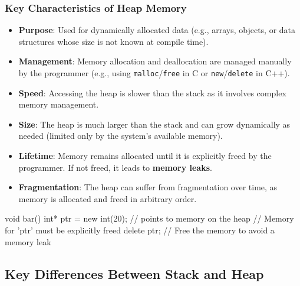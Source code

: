 \subsubsection{Key Characteristics of Heap Memory}
\begin{itemize}
    \item \textbf{Purpose}: Used for dynamically allocated data (e.g., arrays, objects, or data structures whose size is not known at compile time).
    \item \textbf{Management}: Memory allocation and deallocation are managed manually by the programmer (e.g., using \texttt{malloc}/\texttt{free} in C or \texttt{new}/\texttt{delete} in C++).
    \item \textbf{Speed}: Accessing the heap is slower than the stack as it involves complex memory management.
    \item \textbf{Size}: The heap is much larger than the stack and can grow dynamically as needed (limited only by the system's available memory).
    \item \textbf{Lifetime}: Memory remains allocated until it is explicitly freed by the programmer. If not freed, it leads to \textbf{memory leaks}.
    \item \textbf{Fragmentation}: The heap can suffer from fragmentation over time, as memory is allocated and freed in arbitrary order.
\end{itemize}

\begin{exampleblock}
    \begin{codeblock}[language=C++]
void bar() {
    int* ptr = new int(20); // points to memory on the heap
    // Memory for 'ptr' must be explicitly freed
    delete ptr; // Free the memory to avoid a memory leak
}
    \end{codeblock}
\end{exampleblock}

\subsection{Key Differences Between Stack and Heap}

\vspace{-1em}

